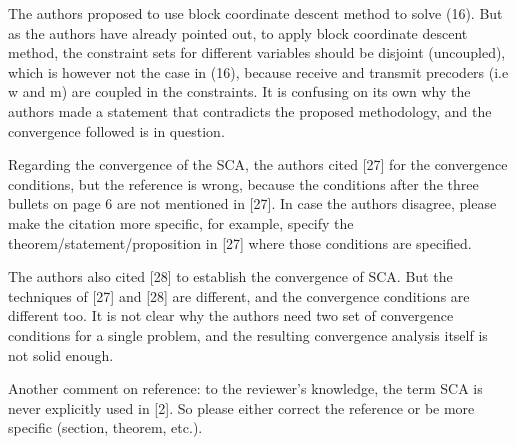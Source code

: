 \begin{itemize}
 The authors proposed to use block coordinate descent method to solve (16). But as the authors have already pointed out, to apply block coordinate descent method, the constraint sets for different variables should be disjoint (uncoupled), which is however not the case in (16), because receive and transmit precoders (i.e w and m) are coupled in the constraints. It is confusing on its own why the authors made a statement that contradicts the proposed methodology, and the convergence followed is in question.

\resp {}

 Regarding the convergence of the SCA, the authors cited [27] for the convergence conditions, but the reference is wrong, because the conditions after the three bullets on page 6 are not mentioned in [27]. In case the authors disagree, please make the citation more specific, for example, specify the theorem/statement/proposition in [27] where those conditions are specified.

\resp {}

 The authors also cited [28] to establish the convergence of SCA. But the techniques of [27] and [28] are different, and the convergence conditions are different too. It is not clear why the authors need two set of convergence conditions for a single problem, and the resulting convergence analysis itself is not solid enough.

\resp {}

 Another comment on reference: to the reviewer's knowledge, the term SCA is never explicitly used in [2]. So please either correct the reference or be more specific (section, theorem, etc.).


\end{itemize}
